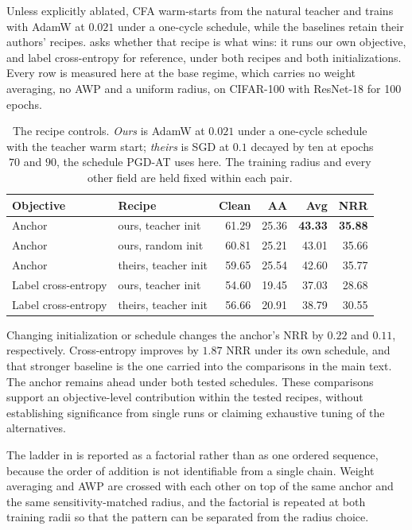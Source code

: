 Unless explicitly ablated, CFA warm-starts from the natural teacher and trains with AdamW at $0.021$
under a one-cycle schedule, while the baselines retain their authors' recipes.  asks
whether that recipe is what wins: it runs our own objective, and label cross-entropy for reference,
under both recipes and both initializations. Every row is measured here at the base regime, which
carries no weight averaging, no AWP and a uniform radius, on CIFAR-100 with ResNet-18 for 100 epochs.

\begin{table}[!htbp]
  \centering \small \setlength{\tabcolsep}{5pt}
  \caption{The recipe controls. \emph{Ours} is AdamW at $0.021$ under a one-cycle schedule with the
  teacher warm start; \emph{theirs} is SGD at $0.1$ decayed by ten at epochs $70$ and $90$, the
  schedule PGD-AT uses here. The training radius and every other field are held fixed within each
  pair.}
  \label{tab:recipe}
  \begin{tabular}{llrrrr}
    \toprule
    Objective & Recipe & Clean & AA & Avg & NRR \\
    \midrule
    Anchor              & ours, teacher init   & 61.29 & 25.36 & \textbf{43.33} & \textbf{35.88} \\
    Anchor              & ours, random init    & 60.81 & 25.21 & 43.01 & 35.66 \\
    Anchor              & theirs, teacher init & 59.65 & 25.54 & 42.60 & 35.77 \\
    \midrule
    Label cross-entropy & ours, teacher init   & 54.60 & 19.45 & 37.03 & 28.68 \\
    Label cross-entropy & theirs, teacher init & 56.66 & 20.91 & 38.79 & 30.55 \\
    \bottomrule
  \end{tabular}
\end{table}



Changing initialization or schedule changes the anchor's NRR by $0.22$ and $0.11$, respectively.
Cross-entropy improves by $1.87$ NRR under its own schedule, and that stronger baseline is the one
carried into the comparisons in the main text. The anchor remains ahead under both tested
schedules. These comparisons support an objective-level contribution within the tested recipes, without establishing significance from
single runs or claiming exhaustive tuning of the alternatives.

The ladder in  is reported as a factorial rather than as one ordered sequence,
because the order of addition is not identifiable from a single chain. Weight averaging and AWP are
crossed with each other on top of the same anchor and the same sensitivity-matched radius, and the
factorial is repeated at both training radii so that the pattern can be separated from the radius
choice.


